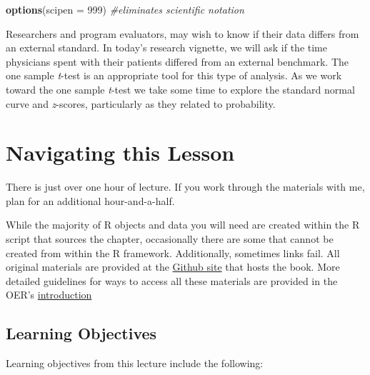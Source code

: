 \documentclass[
  11pt,
]{book}
\newenvironment{Shaded}{\begin{snugshade}}{\end{snugshade}}
\newcommand{\AttributeTok}[1]{\textcolor[rgb]{0.27,0.27,0.27}{#1}}
\newcommand{\CommentTok}[1]{\textcolor[rgb]{0.37,0.37,0.37}{\textit{#1}}}
\newcommand{\DecValTok}[1]{\textcolor[rgb]{0.06,0.06,0.06}{#1}}
\newcommand{\FunctionTok}[1]{\textcolor[rgb]{0.27,0.27,0.27}{\textbf{#1}}}
\newcommand{\NormalTok}[1]{#1}
\begin{document}
\begin{Shaded}
\begin{Highlighting}[]
\FunctionTok{options}\NormalTok{(}\AttributeTok{scipen =} \DecValTok{999}\NormalTok{)  }\CommentTok{\#eliminates scientific notation}
\end{Highlighting}
\end{Shaded}

Researchers and program evaluators, may wish to know if their data differs from an external standard. In today's research vignette, we will ask if the time physicians spent with their patients differed from an external benchmark. The one sample \emph{t}-test is an appropriate tool for this type of analysis. As we work toward the one sample \emph{t}-test we take some time to explore the standard normal curve and \emph{z}-scores, particularly as they related to probability.

\hypertarget{navigating-this-lesson-2}{%
\section{Navigating this Lesson}\label{navigating-this-lesson-2}}

There is just over one hour of lecture. If you work through the materials with me, plan for an additional hour-and-a-half.

While the majority of R objects and data you will need are created within the R script that sources the chapter, occasionally there are some that cannot be created from within the R framework. Additionally, sometimes links fail. All original materials are provided at the \href{https://github.com/lhbikos/ReCenterPsychStats}{Github site} that hosts the book. More detailed guidelines for ways to access all these materials are provided in the OER's \protect\hyperlink{ReCintro}{introduction}

\hypertarget{learning-objectives-2}{%
\subsection{Learning Objectives}\label{learning-objectives-2}}

Learning objectives from this lecture include the following:
\end{document}
